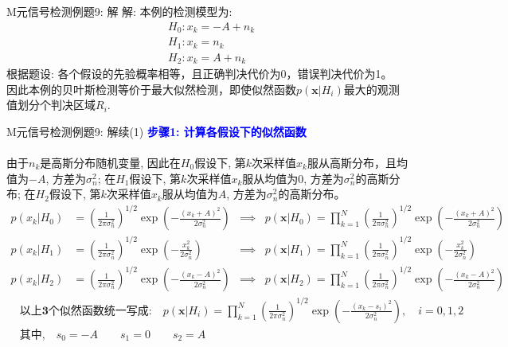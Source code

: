 \begin{frame}[shrink]{M元信号检测例题9: 解}
解: 本例的检测模型为:
\begin{align*}
&H_0: x_k=-A+n_k\\
&H_1: x_k=n_k\\
&H_2: x_k=A+n_k
\end{align*}
根据题设: 各个假设的先验概率相等，且正确判决代价为0，错误判决代价为1。\\
因此本例的贝叶斯检测等价于最大似然检测，即使似然函数$p(\bm{x}|H_i)$最大的观测值划分个判决区域$R_i$.
\end{frame}

\begin{frame}[shrink]{M元信号检测例题9: 解续(1)}
\textbf{\textcolor{blue}{步骤1: 计算各假设下的似然函数}}\\
~\\
由于$n_k$是高斯分布随机变量, 因此在$H_0$假设下, 第$k$次采样值$x_k$服从高斯分布，且均值为$-A$, 方差为$\sigma_n^2$; 在$H_1$假设下, 第$k$次采样值$x_k$服从均值为0, 方差为$\sigma_n^2$的高斯分布; 在$H_2$假设下, 第$k$次采样值$x_k$服从均值为$A$, 方差为$\sigma_n^2$的高斯分布。
\scriptsize
\begin{align*}
p(x_k|H_0)&=\left(\frac{1}{2\pi\sigma_n^2}\right)^{1/2}\exp\left(-\frac{(x_k+A)^2}{2\sigma_n^2}\right)
&\implies& p(\bm{x}|H_0)=\prod_{k=1}^{N}\left(\frac{1}{2\pi\sigma_n^2}\right)^{1/2}\exp\left(-\frac{(x_k+A)^2}{2\sigma_n^2}\right)\\
p(x_k|H_1)&=\left(\frac{1}{2\pi\sigma_n^2}\right)^{1/2}\exp\left(-\frac{x_k^2}{2\sigma_n^2}\right)&\implies& p(\bm{x}|H_1)=\prod_{k=1}^{N}\left(\frac{1}{2\pi\sigma_n^2}\right)^{1/2}\exp\left(-\frac{x_k^2}{2\sigma_n^2}\right)\\
p(x_k|H_2)&=\left(\frac{1}{2\pi\sigma_n^2}\right)^{1/2}\exp\left(-\frac{(x_k-A)^2}{2\sigma_n^2}\right)&\implies& p(\bm{x}|H_2)=\prod_{k=1}^{N}\left(\frac{1}{2\pi\sigma_n^2}\right)^{1/2}\exp\left(-\frac{(x_k-A)^2}{2\sigma_n^2}\right)
\end{align*} 
\normalsize
\begin{align*}
&\textbf{以上3个似然函数统一写成:} \quad p(\bm{x}|H_i)=\prod_{k=1}^{N}\left(\frac{1}{2\pi\sigma_n^2}\right)^{1/2}\exp\left(-\frac{(x_k-s_i)^2}{2\sigma_n^2}\right),\quad i=0,1,2\\
&\text{其中,} \quad s_0=-A\qquad s_1=0\qquad s_2=A
\end{align*}
\end{frame}

